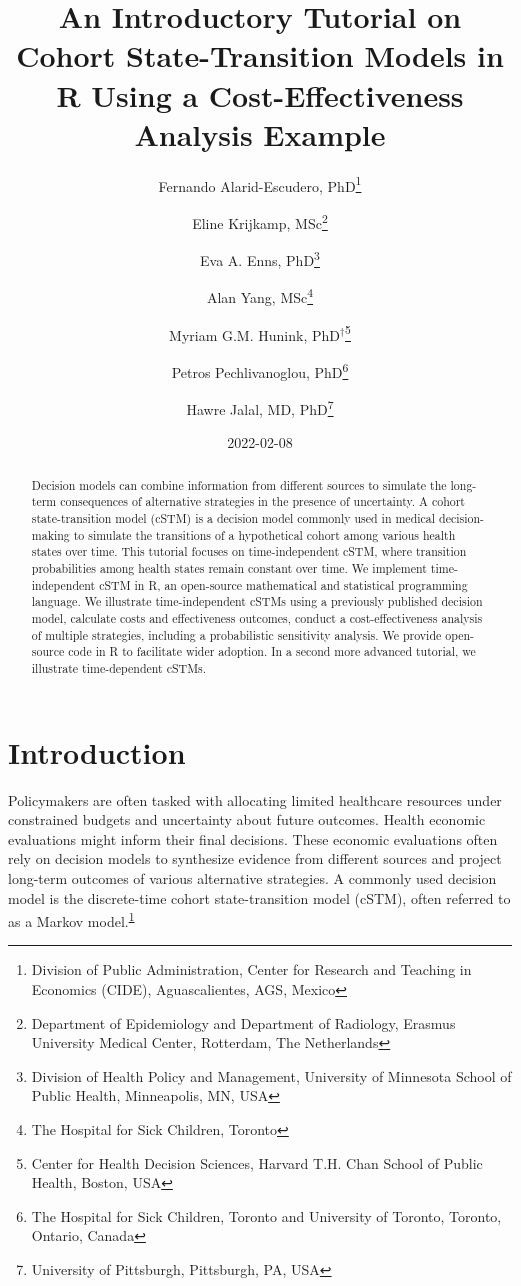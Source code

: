 \documentclass[
]{article}
\title{An Introductory Tutorial on Cohort State-Transition Models in R Using a Cost-Effectiveness Analysis Example}
\author{Fernando Alarid-Escudero, PhD\footnote{Division of Public Administration, Center for Research and Teaching in Economics (CIDE), Aguascalientes, AGS, Mexico} \and Eline Krijkamp, MSc\footnote{Department of Epidemiology and Department of Radiology, Erasmus University Medical Center, Rotterdam, The Netherlands} \and Eva A. Enns, PhD\footnote{Division of Health Policy and Management, University of Minnesota School of Public Health, Minneapolis, MN, USA} \and Alan Yang, MSc\footnote{The Hospital for Sick Children, Toronto} \and Myriam G.M. Hunink, PhD\(^\dagger\)\footnote{Center for Health Decision Sciences, Harvard T.H. Chan School of Public Health, Boston, USA} \and Petros Pechlivanoglou, PhD\footnote{The Hospital for Sick Children, Toronto and University of Toronto, Toronto, Ontario, Canada} \and Hawre Jalal, MD, PhD\footnote{University of Pittsburgh, Pittsburgh, PA, USA}}
\date{2022-02-08}
\begin{document}
\maketitle
\begin{abstract}
Decision models can combine information from different sources to simulate the long-term consequences of alternative strategies in the presence of uncertainty. A cohort state-transition model (cSTM) is a decision model commonly used in medical decision-making to simulate the transitions of a hypothetical cohort among various health states over time. This tutorial focuses on time-independent cSTM, where transition probabilities among health states remain constant over time. We implement time-independent cSTM in R, an open-source mathematical and statistical programming language. We illustrate time-independent cSTMs using a previously published decision model, calculate costs and effectiveness outcomes, conduct a cost-effectiveness analysis of multiple strategies, including a probabilistic sensitivity analysis. We provide open-source code in R to facilitate wider adoption. In a second more advanced tutorial, we illustrate time-dependent cSTMs.
\end{abstract}

{
\setcounter{tocdepth}{2}
\tableofcontents
}
\hypertarget{introduction}{%
\section{Introduction}\label{introduction}}

Policymakers are often tasked with allocating limited healthcare resources under constrained budgets and uncertainty about future outcomes. Health economic evaluations might inform their final decisions. These economic evaluations often rely on decision models to synthesize evidence from different sources and project long-term outcomes of various alternative strategies. A commonly used decision model is the discrete-time cohort state-transition model (cSTM), often referred to as a Markov model.\textsuperscript{\protect\hyperlink{ref-Kuntz2017}{1}}
\end{document}
